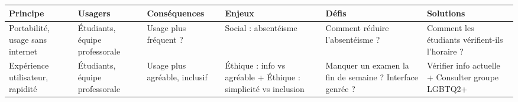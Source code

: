 \begin{tabular}{P{0.15\textwidth}P{0.15\textwidth}P{0.15\textwidth}P{0.15\textwidth}P{0.15\textwidth}P{0.15\textwidth}}
	\hline
	\bf Principe & \bf Usagers & \bf Conséquences & \bf Enjeux & \bf Défis & \bf Solutions \\
	\hline
	\hline
	Portabilité, usage sans internet
	& Étudiants, équipe professorale
	& Usage plus fréquent ?
	& Social : absentéisme
	& Comment réduire l'absentéisme ?
	& Comment les étudiants vérifient-ils l'horaire ?
	\\
	Expérience utilisateur, rapidité
	& Étudiants, équipe professorale
	& Usage plus agréable, inclusif
	& Éthique : info vs agréable + Éthique : simplicité vs inclusion
	& Manquer un examen la fin de semaine ? Interface genrée ?
	& Vérifier info actuelle + Consulter groupe LGBTQ2+
	\\
	\hline
\end{tabular}